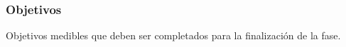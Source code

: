 \subsubsection{Objetivos}
Objetivos medibles que deben ser completados para la finalización de la fase.